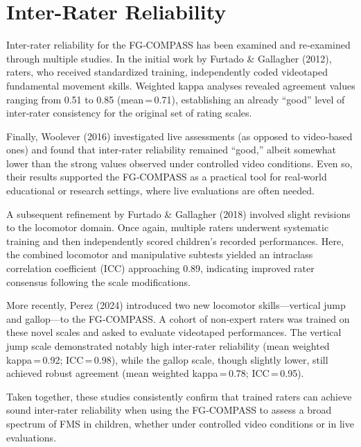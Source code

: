 \documentclass[
  letterpaper,
  DIV=11,
  numbers=noendperiod]{scrreprt}
\begin{document}

\chapter{Inter-Rater Reliability}\label{inter-rater-reliability}

Inter‑rater reliability for the FG‑COMPASS has been examined and
re‑examined through multiple studies. In the initial work by Furtado \&
Gallagher (2012), raters, who received standardized training,
independently coded videotaped fundamental movement skills. Weighted
kappa analyses revealed agreement values ranging from 0.51 to 0.85
(mean\,=\,0.71), establishing an already ``good'' level of inter‑rater
consistency for the original set of rating scales.

Finally, Woolever (2016) investigated live assessments (as opposed to
video‑based ones) and found that inter‑rater reliability remained
``good,'' albeit somewhat lower than the strong values observed under
controlled video conditions. Even so, their results supported the
FG‑COMPASS as a practical tool for real‑world educational or research
settings, where live evaluations are often needed.

A subsequent refinement by Furtado \& Gallagher (2018) involved slight
revisions to the locomotor domain. Once again, multiple raters underwent
systematic training and then independently scored children's recorded
performances. Here, the combined locomotor and manipulative subtests
yielded an intraclass correlation coefficient (ICC) approaching 0.89,
indicating improved rater consensus following the scale modifications.

More recently, Perez (2024) introduced two new locomotor
skills---vertical jump and gallop---to the FG‑COMPASS. A cohort of
non‑expert raters was trained on these novel scales and asked to
evaluate videotaped performances. The vertical jump scale demonstrated
notably high inter‑rater reliability (mean weighted kappa\,=\,0.92;
ICC\,=\,0.98), while the gallop scale, though slightly lower, still
achieved robust agreement (mean weighted kappa\,=\,0.78; ICC\,=\,0.95).

Taken together, these studies consistently confirm that trained raters
can achieve sound inter‑rater reliability when using the FG‑COMPASS to
assess a broad spectrum of FMS in children, whether under controlled
video conditions or in live evaluations.

\end{document}
